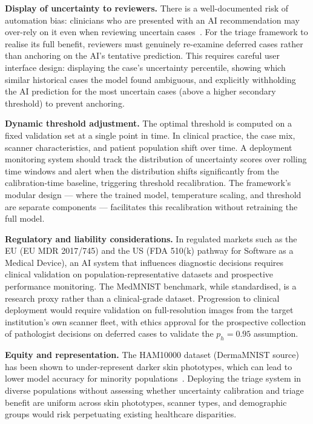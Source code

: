 \textbf{Display of uncertainty to reviewers.} There is a well-documented risk of automation bias: clinicians who are presented with an AI recommendation may over-rely on it even when reviewing uncertain cases~\cite{goddard2012automation}. For the triage framework to realise its full benefit, reviewers must genuinely re-examine deferred cases rather than anchoring on the AI's tentative prediction. This requires careful user interface design: displaying the case's uncertainty percentile, showing which similar historical cases the model found ambiguous, and explicitly withholding the AI prediction for the most uncertain cases (above a higher secondary threshold) to prevent anchoring.

\textbf{Dynamic threshold adjustment.} The optimal threshold is computed on a fixed validation set at a single point in time. In clinical practice, the case mix, scanner characteristics, and patient population shift over time. A deployment monitoring system should track the distribution of uncertainty scores over rolling time windows and alert when the distribution shifts significantly from the calibration-time baseline, triggering threshold recalibration. The framework's modular design --- where the trained model, temperature scaling, and threshold are separate components --- facilitates this recalibration without retraining the full model.

\textbf{Regulatory and liability considerations.} In regulated markets such as the EU (EU MDR 2017/745) and the US (FDA 510(k) pathway for Software as a Medical Device), an AI system that influences diagnostic decisions requires clinical validation on population-representative datasets and prospective performance monitoring. The MedMNIST benchmark, while standardised, is a research proxy rather than a clinical-grade dataset. Progression to clinical deployment would require validation on full-resolution images from the target institution's own scanner fleet, with ethics approval for the prospective collection of pathologist decisions on deferred cases to validate the $p_h = 0.95$ assumption.

\textbf{Equity and representation.} The HAM10000 dataset (DermaMNIST source) has been shown to under-represent darker skin phototypes, which can lead to lower model accuracy for minority populations~\cite{tschandl2018ham10000}. Deploying the triage system in diverse populations without assessing whether uncertainty calibration and triage benefit are uniform across skin phototypes, scanner types, and demographic groups would risk perpetuating existing healthcare disparities.

